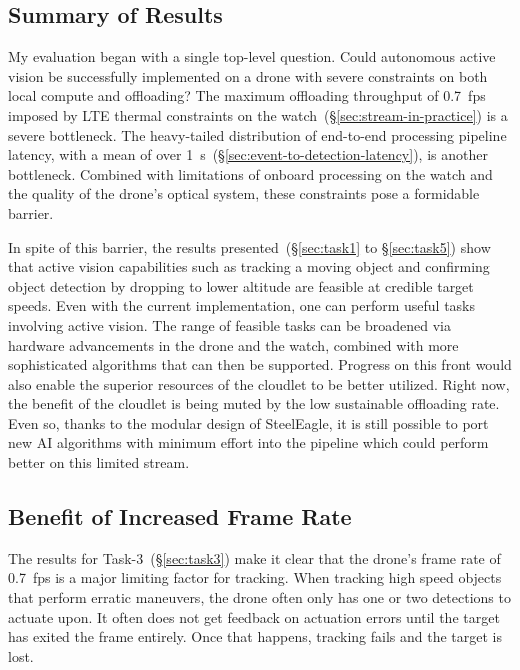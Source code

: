 \subsection{Summary of Results}
\label{sec:take-away}

My evaluation began with a single top-level question.  Could
autonomous active vision be successfully implemented on a drone with
severe constraints on both local compute and offloading?  The maximum
offloading throughput of 0.7~fps imposed by LTE thermal constraints on
the watch~(\S\ref{sec:stream-in-practice}) is a severe bottleneck.  The
heavy-tailed distribution of end-to-end processing pipeline latency,
with a mean of over 1~s~(\S\ref{sec:event-to-detection-latency}), is another
bottleneck.  Combined with limitations of onboard processing on the
watch and the quality of the drone's optical system, these constraints
pose a formidable barrier.

In spite of this barrier, the results presented~(\S\ref{sec:task1} to
\S\ref{sec:task5}) show that active vision capabilities such as
tracking a moving object and confirming object detection by dropping
to lower altitude are feasible at credible target speeds.  Even with
the current implementation, one can perform useful tasks involving
active vision.  The range of feasible tasks can be broadened via
hardware advancements in the drone and the watch, combined with more
sophisticated algorithms that can then be supported.  Progress on this
front would also enable the superior resources of the cloudlet to be better
utilized.  Right now, the benefit of the cloudlet is being muted by the low
sustainable offloading rate. Even so, thanks to the modular design of SteelEagle, it is still possible to port new AI algorithms with minimum effort into the pipeline which could perform better on this limited stream.

\subsection{Benefit of Increased Frame Rate}
\label{sec:discussion-results}

The results for Task-3~(\S\ref{sec:task3}) make it clear that the
drone's frame rate of 0.7~fps is a major limiting factor for tracking.
When tracking high speed objects that perform erratic maneuvers, the
drone often only has one or two detections to actuate upon. It often
does not get feedback on actuation errors until the target has exited
the frame entirely. Once that happens, tracking fails and the target
is lost.

